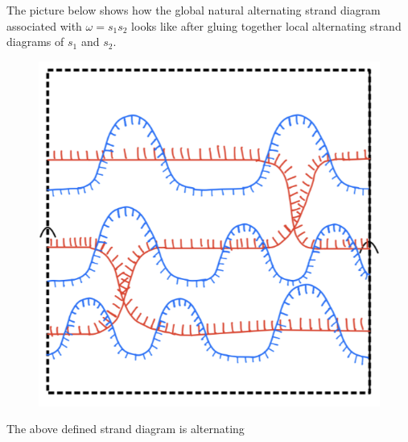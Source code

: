 The picture below shows how the global natural alternating strand diagram associated with $\omega = s_1 s_2$ looks like after gluing together local alternating strand diagrams of $s_1$ and $s_2$.

\begin{figure}[H] 
    \centering
    \includegraphics[scale = 0.95]{diagrams/natural_alternating_diagrams/10.png} 
    \caption{}
    \label{fig:your-label}
\end{figure}

\begin{theorem}
The above defined strand diagram is alternating
\end{theorem}

